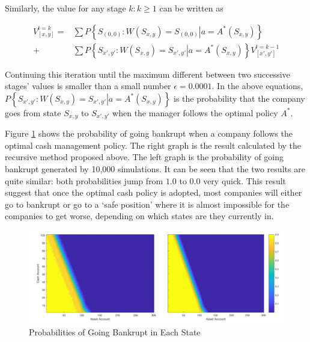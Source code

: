 \documentclass[12pt]{article}
\begin{document}
Similarly, the value for any stage $k: k \geq 1$ can be written as

\[
\begin{split}
V_{[x,y]}^{t=k} =& \sum P\left\{\left.S_{(0,0)}:W(S_{x,y}) = S_{(0,0)}\right|a = A^*(S_{x,y})\right\} 
\\ 
+ & \sum P\left\{ \left. S_{x',y'}:W(S_{x,y}) = S_{x',y'} \right| a = A^* (S_{x,y})\right\}  V_{[x',y']}^{t=k-1}
\end{split}
\]
 
 
  Continuing this iteration until the maximum different between two successive stages' values is smaller than a small number $\epsilon =  0.0001$. In the above equations, $P\left\{ \left. S_{x',y'}:W(S_{x,y}) = S_{x',y'} \right| a = A^* (S_{x,y})\right\}$ is the probability that the company goes from state  $S_{x,y}$ to $S_{x',y'}$ when the manager follows the optimal policy $A^*$.
  
Figure \ref{prob} shows the probability of going bankrupt when a company follows the optimal cash management policy. The right graph is the result calculated by the recursive method proposed above. The left graph is the probability of going bankrupt generated by 10,000 simulations. It can be seen that the two results are quite similar: both probabilities jump from $1.0$ to $0.0$ very quick. This result suggest that once the optimal cash policy is adopted, most companies will either go to bankrupt or go to a `safe position' where it is almost impossible for the companies to get worse, depending on which states are they currently in.



\begin{figure}
\begin{center}
\includegraphics[scale=.40]{prob}
\end{center}
\caption{Probabilities of Going Bankrupt in Each State}
\label{prob}
\end{figure}
\end{document}
